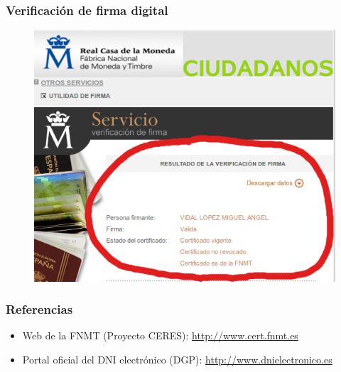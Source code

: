 \documentclass{beamer}
\begin{document}
\begin{frame}
\frametitle{Verificación de firma digital}

\begin{figure}
	\begin{center}
	\includegraphics[scale=0.40,clip=true]{figs/firma-ver.png} 	
	\end{center}
\end{figure}

\end{frame}


\begin{frame} 
\frametitle{Referencias}

\begin{itemize}
\item Web de la FNMT (Proyecto CERES): \url{http://www.cert.fnmt.es}
\item Portal oficial del DNI electrónico (DGP): \url{http://www.dnielectronico.es}
\end{itemize}

\end{frame}




{
}
\end{document}
